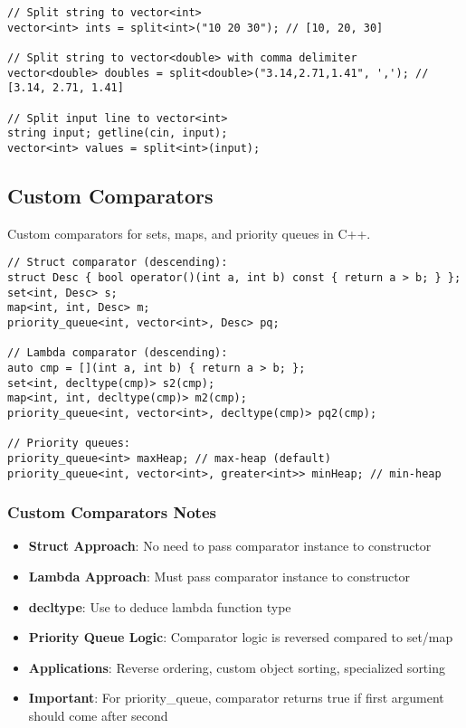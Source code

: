 \documentclass[11pt,a4paper]{article}
\begin{document}
\begin{lstlisting}[caption={String Split Examples}]
// Split string to vector<int>
vector<int> ints = split<int>("10 20 30"); // [10, 20, 30]

// Split string to vector<double> with comma delimiter
vector<double> doubles = split<double>("3.14,2.71,1.41", ','); // [3.14, 2.71, 1.41]

// Split input line to vector<int>
string input; getline(cin, input);
vector<int> values = split<int>(input);
\end{lstlisting}



\newpage
\subsection{Custom Comparators}
Custom comparators for sets, maps, and priority queues in C++.
\begin{lstlisting}[caption={Custom Comparator Approaches}]
// Struct comparator (descending):
struct Desc { bool operator()(int a, int b) const { return a > b; } };
set<int, Desc> s; 
map<int, int, Desc> m; 
priority_queue<int, vector<int>, Desc> pq;

// Lambda comparator (descending):
auto cmp = [](int a, int b) { return a > b; };
set<int, decltype(cmp)> s2(cmp);
map<int, int, decltype(cmp)> m2(cmp);
priority_queue<int, vector<int>, decltype(cmp)> pq2(cmp);

// Priority queues:
priority_queue<int> maxHeap; // max-heap (default)
priority_queue<int, vector<int>, greater<int>> minHeap; // min-heap
\end{lstlisting}

\subsubsection{Custom Comparators Notes}
\begin{itemize}
\item \textbf{Struct Approach}: No need to pass comparator instance to constructor
\item \textbf{Lambda Approach}: Must pass comparator instance to constructor
\item \textbf{decltype}: Use to deduce lambda function type
\item \textbf{Priority Queue Logic}: Comparator logic is reversed compared to set/map
\item \textbf{Applications}: Reverse ordering, custom object sorting, specialized sorting
\item \textbf{Important}: For priority\_queue, comparator returns true if first argument should come after second
\end{itemize}
\end{document}
